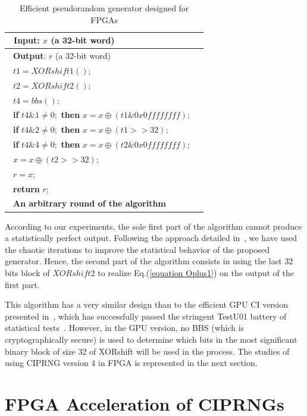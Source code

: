 \begin{table}
\caption{Efficient pseudorandom generator designed for FPGAs}
\centering
\begin{tabular}{|l|l|}
\hline
~\textbf{Input}: $x$ (a 32-bit word)\\
\hline
~\textbf{Output}: $r$ (a 32-bit word)\\
\hline
~$t1 = XORshift1();$\\
~$t2 = XORshift2();$\\
~$t4 = bbs();$\\
~\textbf{if} $t4 \& 1 \neq 0;$ \textbf{then} $x = x \oplus (t1 \& 0x0ffffffff);$\\
~\textbf{if} $t4 \& 2 \neq 0;$ \textbf{then} $x = x \oplus (t1 >> 32);$\\
~\textbf{if} $t4 \& 4 \neq 0;$ \textbf{then} $x = x \oplus (t2 \& 0x0ffffffff);$\\
~$x = x \oplus (t2 >> 32);$\\
~$r = x;$\\
~\textbf{return} $r;$\\
\hline
~\textbf{An arbitrary round of the algorithm}~\\
\hline
\end{tabular}
\label{fpga ci}
\end{table}

According to our experiments, the sole first part of the algorithm cannot 
produce a statistically perfect output. 
Following the approach detailed in~\cite{bfg12a:ip}, 
we have used the chaotic iterations to improve the 
statistical behavior of the proposed generator.
Hence, the second part of the algorithm consists 
in using the last $32$ bits block of $XORshift2$ 
to realize Eq.(\ref{equation Oplus1}) on the output 
of the first part. 

This algorithm has a very similar design than to the efficient GPU CI version
presented in~\cite{DBLP:journals/corr/abs-1112-5239}, which has 
successfully passed the stringent TestU01 battery of statistical 
tests~\cite{Lecuyer2009}.
However, in the GPU version, no BBS (which is cryptographically secure) is used to determine which bits
in the most significant binary block of size 32 of XORshift
will be used in the process. The studies of using CIPRNG version 4 in FPGA is represented in the next section.


\section{FPGA Acceleration of CIPRNGs}
\label{FPGA Acceleration of CIPRNGs}

